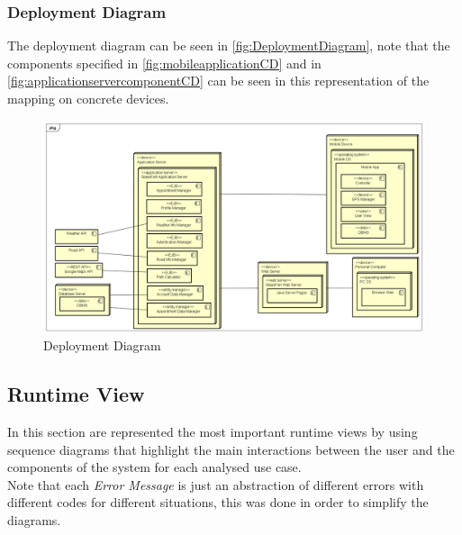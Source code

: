\begin{samepage}
\subsubsection{Deployment Diagram}
The deployment diagram can be seen in \autoref{fig:DeploymentDiagram}, note that the components specified in \autoref{fig:mobileapplicationCD} and in \autoref{fig:applicationservercomponentCD} can be seen in this representation of the mapping on concrete devices.
\begin{figure}[h]
\centering
\includegraphics[scale=0.40, angle=90]{Img/DeploymentDiagram}
\caption{Deployment Diagram}
\label{fig:DeploymentDiagram}
\end{figure}
\end{samepage}

\clearpage
\subsection{Runtime View}
In this section are represented the most important runtime views by using sequence diagrams that highlight the main interactions between the user and the components of the system for each analysed use case.\\
Note that each \emph{Error Message} is just an abstraction of different errors with different codes for different situations, this was done in order to simplify the diagrams.

